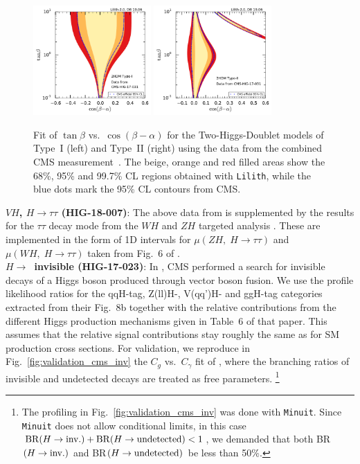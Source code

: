 \begin{figure}[t!]\centering
\includegraphics[width=0.4\textwidth]{validation/CMS/HIG-17-031-2HDM-Type1.pdf}%
\includegraphics[width=0.4\textwidth]{validation/CMS/HIG-17-031-2HDM-Type2.pdf}%
\vspace*{-2mm}
\caption{Fit of $\tan\beta$ vs.\ $\cos(\beta-\alpha)$ for the Two-Higgs-Doublet models of Type~I (left) and Type~II (right) 
using the data from the combined CMS measurement~\cite{Sirunyan:2018koj}. 
The beige, orange and red filled areas show the 68\%, 95\% and 99.7\% CL regions obtained with {\tt Lilith}, 
while the blue dots mark the 95\% CL contours from CMS.}
\label{fig:validation_cms_2hdm}
\end{figure}

{\bf\boldmath $VH$, $H\to\tau\tau$ (HIG-18-007)}: The above data from \cite{Sirunyan:2018koj} is supplemented by the results 
for the $\tau\tau$ decay mode from the $WH$ and $ZH$ targeted analysis \cite{Sirunyan:2018cpi}. These are implemented in the 
form of 1D intervals for $\mu(ZH,\;H\to\tau\tau)$ and $\mu(WH,\;H\to\tau\tau)$ taken from Fig.~6 of \cite{Sirunyan:2018cpi}. \\

{\bf\boldmath $H\to$~invisible (HIG-17-023)}: 
In \cite{Sirunyan:2018owy}, CMS performed a search for invisible decays of a Higgs boson produced through vector boson fusion. 
We use the profile likelihood ratios for the qqH-tag, Z(ll)H-, V(qq')H- and ggH-tag categories extracted 
from their Fig.~8b together with the relative contributions from the different Higgs production mechanisms  
given in Table~6 of that paper. This assumes that the relative signal contributions stay roughly the same as for 
SM production cross sections. For validation, we reproduce in Fig.~\ref{fig:validation_cms_inv}
 the $C_g$ vs.\ $C_\gamma$ fit of \cite{Sirunyan:2018koj}, where the branching ratios of invisible and undetected decays 
are treated as free parameters.%
\footnote{The profiling in Fig.~\ref{fig:validation_cms_inv} was done with {\tt Minuit}. 
  Since {\tt Minuit} does not allow conditional limits, in this case ${\rm BR}(H\to {\rm inv.})+{\rm BR}(H\to {\rm undetected})<1$, 
  we demanded that both BR$(H\to {\rm inv.})$ and BR$(H\to {\rm undetected})$ be less than 50\%.} 

